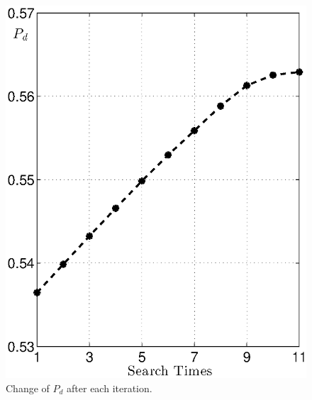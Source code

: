 \documentclass[12pt,journal,a4paper,twoside,onecolumn]{IEEEtran}
\begin{document}
\begin{spacing}{2.5}
\begin{figure}[!t]
\centering
\includegraphics[width=12cm]{PDchange.eps}
\caption{Change of $P_d$ after each iteration.}
\label{pic: PDchange}
\end{figure}

\end{spacing}
\end{document}
